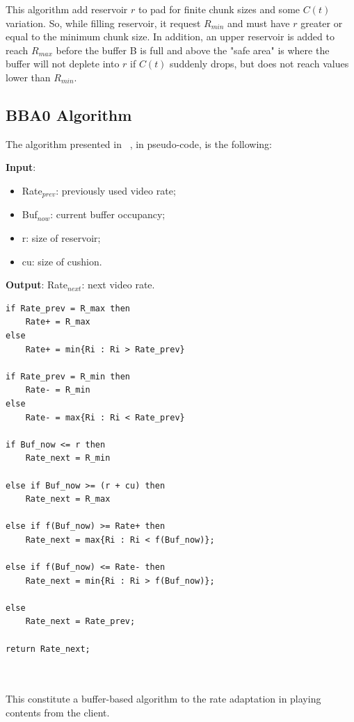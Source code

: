 \documentclass[a4paper]{report}
\begin{document}
This algorithm add reservoir $r$ to pad for finite chunk sizes and some $C(t)$ variation. So, while filling reservoir, it request $R_{min}$ and must have $r$ greater or equal to the minimum chunk size. In addition, an upper reservoir is added to reach $R_{max}$ before the buffer B is full and above the "safe area" is where the buffer will not deplete into $r$ if $C(t)$ suddenly drops, but does not reach values lower than $R_{min}$.

\subsection{BBA0 Algorithm}
The algorithm presented in ~\citep{Huang:2014:BAR:2740070.2626296}, in pseudo-code, is the following:

\textbf{Input}: 
\begin{itemize}
\item Rate$_{prev}$: previously used video rate;

\item Buf$_{now}$: current buffer occupancy;

\item r: size of reservoir;

\item cu: size of cushion.

\end{itemize}

\textbf{Output}: Rate$_{next}$: next video rate.

\begin{Verbatim}
if Rate_prev = R_max then
	Rate+ = R_max
else
	Rate+ = min{Ri : Ri > Rate_prev}

if Rate_prev = R_min then
	Rate- = R_min
else
	Rate- = max{Ri : Ri < Rate_prev}

if Buf_now <= r then
	Rate_next = R_min

else if Buf_now >= (r + cu) then
	Rate_next = R_max

else if f(Buf_now) >= Rate+ then
	Rate_next = max{Ri : Ri < f(Buf_now)};

else if f(Buf_now) <= Rate- then
	Rate_next = min{Ri : Ri > f(Buf_now)};

else
	Rate_next = Rate_prev;

return Rate_next;
	
	
\end{Verbatim}

This constitute a buffer-based algorithm to the rate adaptation in playing contents from the client.
\end{document}
